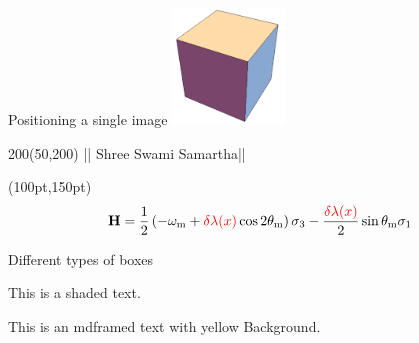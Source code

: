 \documentclass{beamer}
\begin{document}
\begin{frame}{Positioning a single image}
 \includegraphics[width=3cm, heigth=3cm]{figs/cube}
 \setlength{\TPHorizModule}{\textwidth}
 \setlength{\TPVertModule}{\textwidth}
 \begin{textblock*}{200}(50,200)
  || Shree Swami Samartha||
 \end{textblock*}
 \begin{textblock*}{10pt}(100pt,150pt)
\small
\begin{equation*}
    \mathbf {H} = \frac{1}{2}\left( - \omega_{\mathrm{m}} + {\color{red}\delta \lambda(x)} \cos 2\theta_{\mathrm{m}} \right) \sigma_3 - \frac{  {\color{red}\delta \lambda(x)}  }{2} \sin \theta_{\mathrm{m}} \sigma_1
\end{equation*}
\end{textblock*}

\end{frame}


\begin{frame}{Different types of boxes}


\begin{shaded}
 This is a shaded text.
\end{shaded}




\begin{mdframed}[backgroundcolor = yellow]
This is an mdframed text with yellow Background. 
\end{mdframed}

\end{frame}

\end{document}

